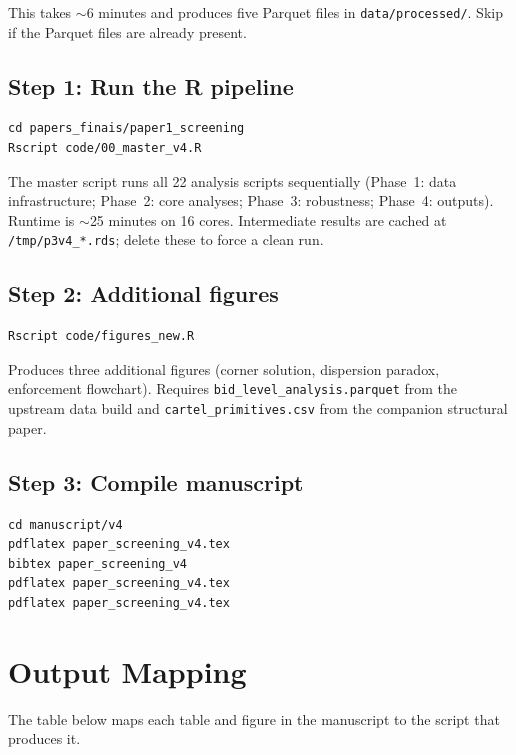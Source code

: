 \documentclass[11pt]{article}
\begin{document}
\noindent This takes $\sim$6 minutes and produces five Parquet files in
\texttt{data/processed/}. Skip if the Parquet files are already present.

\subsection{Step 1: Run the R pipeline}

\begin{verbatim}
cd papers_finais/paper1_screening
Rscript code/00_master_v4.R
\end{verbatim}

\noindent The master script runs all 22 analysis scripts sequentially
(Phase~1: data infrastructure; Phase~2: core analyses; Phase~3:
robustness; Phase~4: outputs). Runtime is $\sim$25 minutes on 16
cores. Intermediate results are cached at \texttt{/tmp/p3v4\_*.rds};
delete these to force a clean run.

\subsection{Step 2: Additional figures}

\begin{verbatim}
Rscript code/figures_new.R
\end{verbatim}

\noindent Produces three additional figures (corner solution, dispersion
paradox, enforcement flowchart). Requires
\texttt{bid\_level\_analysis.parquet} from the upstream data build and
\texttt{cartel\_primitives.csv} from the companion structural paper.

\subsection{Step 3: Compile manuscript}

\begin{verbatim}
cd manuscript/v4
pdflatex paper_screening_v4.tex
bibtex paper_screening_v4
pdflatex paper_screening_v4.tex
pdflatex paper_screening_v4.tex
\end{verbatim}

\section{Output Mapping}

The table below maps each table and figure in the manuscript to the
script that produces it.
\end{document}
